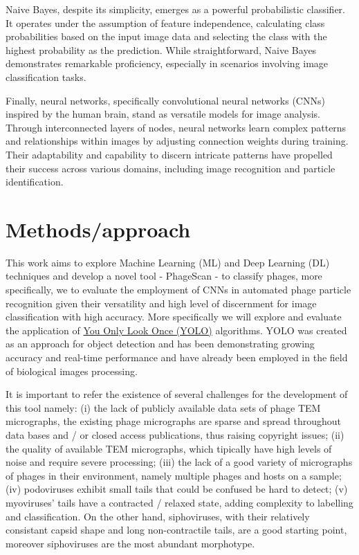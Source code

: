 \documentclass[runningheads]{llncs}
\begin{document}
Naive Bayes, despite its simplicity, emerges as a powerful probabilistic classifier. It operates under the assumption of feature independence, calculating class probabilities based on the input image data and selecting the class with the highest probability as the prediction. While straightforward, Naive Bayes demonstrates remarkable proficiency, especially in scenarios involving image classification tasks. \cite{desouza2022} 

Finally, neural networks, specifically convolutional neural networks (CNNs) inspired by the human brain, stand as versatile models for image analysis. Through interconnected layers of nodes, neural networks learn complex patterns and relationships within images by adjusting connection weights during training. Their adaptability and capability to discern intricate patterns have propelled their success across various domains, including image recognition and particle identification. \cite{teuwen2020}

\section{Methods/approach}

This work aims to explore Machine Learning (ML) and Deep Learning (DL) techniques and develop a novel tool - PhageScan - to classify phages, more specifically, we to evaluate the employment of CNNs in automated phage particle recognition given their versatility and high level of discernment for image classification with high accuracy. \cite{ogura2004} More specifically we will explore and evaluate the application of \href{https://docs.ultralytics.com/models/yolov8/}{You Only Look Once (YOLO)} algorithms. YOLO was created as an approach for object detection and has been demonstrating growing accuracy and real-time performance and have already been employed in the field of biological images processing. \cite{li2023,zhu2023,gonzalez2023}

It is important to refer the existence of several challenges for the development of this tool namely: (i) the lack of publicly available data sets of phage TEM micrographs, the existing phage micrographs are sparse and spread throughout data bases and / or closed access publications, thus raising copyright issues; (ii) the quality of available TEM micrographs, which tipically have high levels of noise and require severe processing; (iii) the lack of a good variety of micrographs of phages in their environment, namely multiple phages and hosts on a sample; (iv) podoviruses exhibit small tails that could be confused be hard to detect; (v) myoviruses' tails have a contracted / relaxed state, adding complexity to labelling and classification. On the other hand, siphoviruses, with their relatively consistant capsid shape and long non-contractile tails, are a good starting point, moreover siphoviruses are the most abundant morphotype. 
\end{document}
